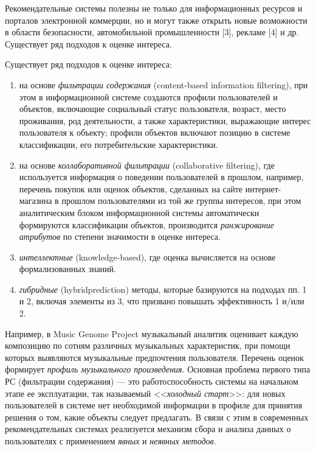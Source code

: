 \documentclass[a4paper,14pt,openany,final]{extreport} %
\begin{document}
Рекомендательные системы полезны не только для информационных ресурсов и порталов электронной коммерции, но и могут также открыть новые возможности в области безопасности, автомобильной промышленности [3], рекламе [4] и др.
Существует ряд подходов к оценке интереса.

Существует ряд подходов к оценке интереса:
\begin{enumerate}
\item на основе \emph{фильтрации содержания}
  (\foreignlanguage{english}{content-based information filtering}), при этом в информационной
  системе создаются профили пользователей и объектов, включающие
  социальный статус пользователя, возраст, место проживания, род
  деятельности, а также характеристики, выражающие интерес
  пользователя к объекту; профили объектов включают позицию в системе
  классификации, его потребительские характеристики. %
\item	на основе\emph{ коллаборативной фильтрации} (\foreignlanguage{english}{collaborative filtering}), где используется информация о поведении пользователей в прошлом, например, перечень покупок или оценок объектов, сделанных на сайте интернет-магазина в прошлом пользователями из той же группы интересов, при этом аналитическим блоком информационной системы автоматически формируются классификации объектов, производится \emph{ранжирование атрибутов} по степени значимости в оценке интереса.
\item	\emph{интеллектные} (knowledge-based), где оценка вычисляется на основе формализованных знаний.
\item	\emph{гибридные} (\foreignlanguage{english}{hybridprediction}) методы, которые базируются на подходах пп. 1 и 2, включая элементы из 3, что призвано повышать эффективность 1 и/или 2.
\end{enumerate}

Например, в Music Genome Project музыкальный аналитик оценивает каждую композицию по сотням различных музыкальных характеристик, при помощи которых выявляются музыкальные предпочтения пользователя. Перечень оценок формирует \emph{профиль музыкального произведения}. Основная проблема первого типа РС (фильтрации содержания) — это работоспособность системы на начальном этапе ее эксплуатации, так называемый <<\emph{холодный старт}>>: для новых пользователей в системе нет необходимой информации в профиле для принятия решения о том, какие объекты следует предлагать. В связи с этим в современных рекомендательных системах реализуется механизм сбора и анализа данных о пользователях с применением \emph{явных} и \emph{неявных методов}.
\end{document}
